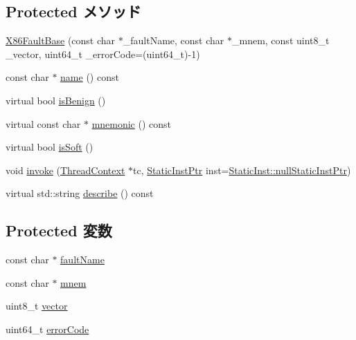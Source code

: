 \subsection*{Protected メソッド}
\begin{DoxyCompactItemize}
\item 
\hyperlink{classX86ISA_1_1X86FaultBase_ac24434dc998ec2bfc13a71d8a5a52c92}{X86FaultBase} (const char $\ast$\_\-faultName, const char $\ast$\_\-mnem, const uint8\_\-t \_\-vector, uint64\_\-t \_\-errorCode=(uint64\_\-t)-\/1)
\item 
const char $\ast$ \hyperlink{classX86ISA_1_1X86FaultBase_a862958aa3c2b9bf36903f1f0f2e81c54}{name} () const 
\item 
virtual bool \hyperlink{classX86ISA_1_1X86FaultBase_a3f9ecaf4044752e713522ecf7d8be3b3}{isBenign} ()
\item 
virtual const char $\ast$ \hyperlink{classX86ISA_1_1X86FaultBase_ac61515b292d6c2669e040bc32e987aaf}{mnemonic} () const 
\item 
virtual bool \hyperlink{classX86ISA_1_1X86FaultBase_a097619346ac87f9db97e3fdd59b81466}{isSoft} ()
\item 
void \hyperlink{classX86ISA_1_1X86FaultBase_a2bd783b42262278d41157d428e1f8d6f}{invoke} (\hyperlink{classThreadContext}{ThreadContext} $\ast$tc, \hyperlink{classRefCountingPtr}{StaticInstPtr} inst=\hyperlink{classStaticInst_aa793d9793af735f09096369fb17567b6}{StaticInst::nullStaticInstPtr})
\item 
virtual std::string \hyperlink{classX86ISA_1_1X86FaultBase_a1d7f1c12bd9a77eda766e6e8dca31e50}{describe} () const 
\end{DoxyCompactItemize}
\subsection*{Protected 変数}
\begin{DoxyCompactItemize}
\item 
const char $\ast$ \hyperlink{classX86ISA_1_1X86FaultBase_ae22cddc5ef9722fc965147e9eba686a1}{faultName}
\item 
const char $\ast$ \hyperlink{classX86ISA_1_1X86FaultBase_a7bb17f43dadf35d103ef6a25b64c4e9f}{mnem}
\item 
uint8\_\-t \hyperlink{classX86ISA_1_1X86FaultBase_ae369101f45bd256ca2745204afe38a47}{vector}
\item 
uint64\_\-t \hyperlink{classX86ISA_1_1X86FaultBase_a0569d3106ee8c4c5e61fcbf93f13379d}{errorCode}
\end{DoxyCompactItemize}


